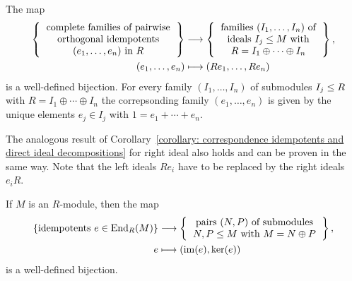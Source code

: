 

\begin{corollary}
  \label{corollary: correspondence idempotents and direct ideal decompositions}
  The map
  \begin{align*}
    \left\{
      \begin{tabular}{c}
        complete families of pairwise \\
        orthogonal idempotents  \\
        $(e_1, \dotsc, e_n)$ in $R$
      \end{tabular}
    \right\}
    &\longto
      \left\{
      \begin{tabular}{c}
        families $(I_1, \dotsc, I_n)$ of  \\
        ideals $I_j \moduleleq M$ with \\
        $R = I_1 \oplus \dotsb \oplus I_n$
      \end{tabular}
      \right\},
    \\
                  (e_1, \dotsc, e_n)
    &\longmapsto  (Re_1, \dotsc, Re_n)
  \end{align*}
  is a well-defined bijection.
  For every family $(I_1, \dotsc, I_n)$ of submodules $I_j \leq R$ with $R = I_1 \oplus \dotsb \oplus I_n$ the correpsonding family $(e_1, \dotsc, e_n)$ is given by the unique elements $e_j \in I_j$ with $1 = e_1 + \dotsb + e_n$.
\end{corollary}




\begin{remark}
  The analogous result of Corollary~\ref{corollary: correspondence idempotents and direct ideal decompositions} for right ideal also holds and can be proven in the same way.
  Note that the left ideals $R e_i$ have to be replaced by the right ideals $e_i R$.
\end{remark}


\begin{corollary}
  \label{corollary: projections correspond to decompositions}
  If $M$ is an $R$-module, then the map
  \begin{align*}
    \{ \text{idempotents $e \in \End_R(M)$} \}
    &\longto
      \left\{
      \begin{tabular}{c}
        pairs $(N,P)$ of submodules \\
        $N, P \moduleleq M$ with $M = N \oplus P$
      \end{tabular}
      \right\},
    \\
                  e
    &\longmapsto  (\im(e), \ker(e))
  \end{align*}
  is a well-defined bijection.
\end{corollary}


